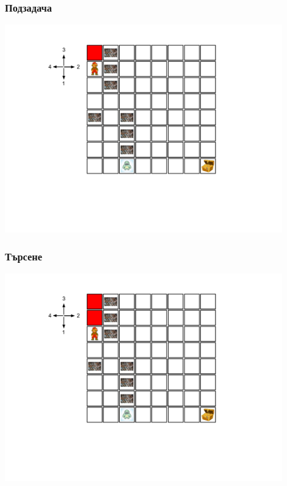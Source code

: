 \documentclass{beamer}
\begin{document}
\begin{frame}[fragile]
\frametitle{Подзадача}
\includegraphics[width=12cm]{images/lab_01}
\end{frame}

\begin{frame}[fragile]
\frametitle{Търсене}
\includegraphics[width=12cm]{images/lab_02}
\end{frame}
\end{document}
